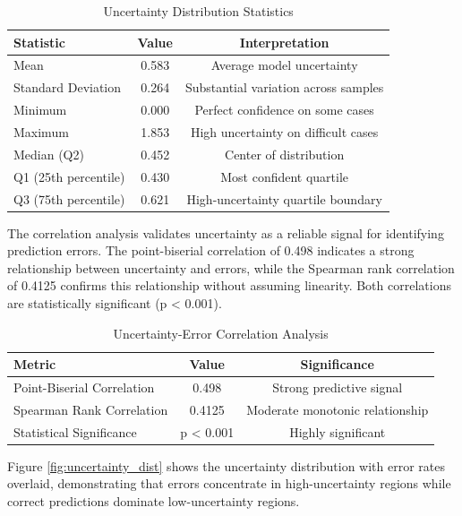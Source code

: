 \documentclass[10pt,a4paper]{article}
\begin{document}
\begin{table}[h]
\centering
\caption{Uncertainty Distribution Statistics}
\label{tab:uncertainty_stats}
\begin{tabular}{lcc}
\toprule
\textbf{Statistic} & \textbf{Value} & \textbf{Interpretation} \\
\midrule
Mean & 0.583 & Average model uncertainty \\
Standard Deviation & 0.264 & Substantial variation across samples \\
Minimum & 0.000 & Perfect confidence on some cases \\
Maximum & 1.853 & High uncertainty on difficult cases \\
Median (Q2) & 0.452 & Center of distribution \\
Q1 (25th percentile) & 0.430 & Most confident quartile \\
Q3 (75th percentile) & 0.621 & High-uncertainty quartile boundary \\
\bottomrule
\end{tabular}
\end{table}

The correlation analysis validates uncertainty as a reliable signal for identifying prediction errors. The point-biserial correlation of 0.498 indicates a strong relationship between uncertainty and errors, while the Spearman rank correlation of 0.4125 confirms this relationship without assuming linearity. Both correlations are statistically significant (p < 0.001).

\begin{table}[h]
\centering
\caption{Uncertainty-Error Correlation Analysis}
\label{tab:uncertainty_correlation}
\begin{tabular}{lcc}
\toprule
\textbf{Metric} & \textbf{Value} & \textbf{Significance} \\
\midrule
Point-Biserial Correlation & 0.498 & Strong predictive signal \\
Spearman Rank Correlation & 0.4125 & Moderate monotonic relationship \\
Statistical Significance & p < 0.001 & Highly significant \\
\bottomrule
\end{tabular}
\end{table}

Figure \ref{fig:uncertainty_dist} shows the uncertainty distribution with error rates overlaid, demonstrating that errors concentrate in high-uncertainty regions while correct predictions dominate low-uncertainty regions.
\end{document}
